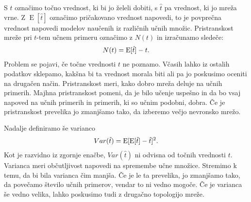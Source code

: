 \documentclass[mat1]{fmfdelo}
\begin{document}
S $t$ označimo točno vrednost, ki bi jo želeli dobiti, s $\hat{t}$ pa vrednost, ki jo mreža vrne. Z $\operatorname{E}[\hat{t}]$ označimo pričakovano vrednost napovedi, to je povprečna vrednost napovedi modelov naučenih iz različnih učnih množic. Pristranskost mreže pri $t$-tem učnem primeru označimo z $N(t)$ in izračunamo sledeče:
%
\begin{equation}
N(t) = \operatorname{E}[\hat{t}] - t \text.
\end{equation}
%
Problem se pojavi, če točne vrednosti $t$ ne poznamo. Včasih lahko iz ostalih podatkov sklepamo, kakšna bi ta vrednost morala biti ali pa jo poskusimo oceniti na drugačen način. Pristranskost meri, kako dobro mreža deluje na učnih primerih. Majhna pristranskost pomeni, da je bilo učenje uspešno in da bo vsaj napoved na učnih primerih in primerih, ki so učnim podobni, dobra. Če je pristranskost prevelika jo zmanjšamo tako, da izberemo večjo nevronsko mrežo.

Nadalje definiramo še varianco
%
\begin{equation}
Var(\hat{t}) = \operatorname{E}[\operatorname{E}[\hat{t}] -\hat{t}]^2\text.
\end{equation}
%
Kot je razvidno iz zgornje enačbe, $Var(\hat{t})$ ni odvisna od točnih vrednosti $t$. Varianca meri  občutljivost napovedi na spremembe učne množice. Stremimo k temu, da bi bila varianca čim manjša. Če je le ta prevelika, jo zmanjšamo tako, da povečamo število učnih primerov, vendar to ni vedno mogoče. Če je varianca še vedno velika, lahko poskusimo tudi z drugačno topologijo mreže.
\end{document}
